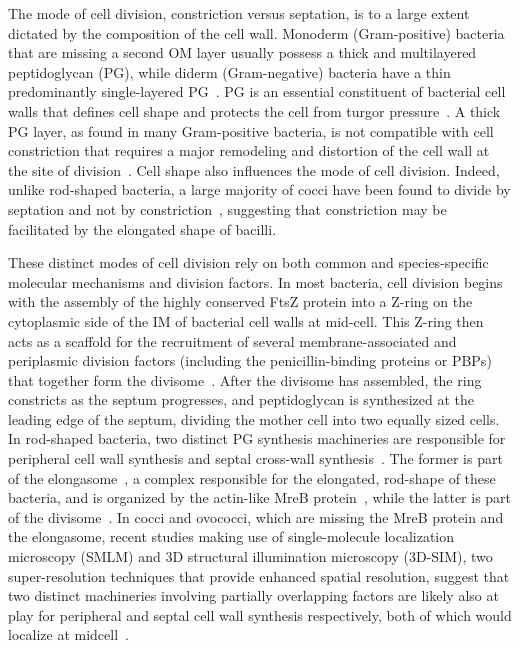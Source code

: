 The mode of cell division, constriction versus septation, is to a large extent dictated by the composition of the cell wall.
Monoderm (Gram-positive) bacteria that are missing a second OM layer usually possess a thick and multilayered peptidoglycan (PG), while diderm (Gram-negative) bacteria have a thin predominantly single-layered PG~\cite{gardePeptidoglycanStructureSynthesis2021}.
PG is an essential constituent of bacterial cell walls that defines cell shape and protects the cell from turgor pressure~\cite{gardePeptidoglycanStructureSynthesis2021}.
A thick PG layer, as found in many Gram-positive bacteria, is not compatible with cell constriction that requires a major remodeling and distortion of the cell wall at the site of division~\cite{nguyenSimulationsSuggestConstrictive2019}.
Cell shape also influences the mode of cell division.
Indeed, unlike rod-shaped bacteria, a large majority of cocci have been found to divide by septation and not by constriction~\cite{zapunDifferentShapesCocci2008,pinhoHowGetMechanisms2013}, suggesting that constriction may be facilitated by the elongated shape of bacilli.

These distinct modes of cell division rely on both common and species-specific molecular mechanisms and division factors.
In most bacteria, cell division begins with the assembly of the highly conserved FtsZ protein into a Z-ring on the cytoplasmic side of the IM of bacterial cell walls at mid-cell.
This Z-ring then acts as a scaffold for the recruitment of several membrane-associated and periplasmic division factors (including the penicillin-binding proteins or PBPs) that together form the divisome~\cite{pinhoHowGetMechanisms2013}.
After the divisome has assembled, the ring constricts as the septum progresses, and peptidoglycan is synthesized at the leading edge of the septum, dividing the mother cell into two equally sized cells.
In rod-shaped bacteria, two distinct PG synthesis machineries are responsible for peripheral cell wall synthesis and septal cross-wall synthesis~\cite{eganRegulationPeptidoglycanSynthesis2020}.
The former is part of the elongasome~\cite{eganRegulationPeptidoglycanSynthesis2020}, a complex responsible for the elongated, rod-shape of these bacteria, and is organized by the actin-like MreB protein~\cite{eganRegulationBacterialCell2017}, while the latter is part of the divisome~\cite{duAssemblyActivationEscherichia2017,denblaauwenDivisome25Road2017}.
In cocci and ovococci, which are missing the MreB protein and the elongasome, recent studies making use of single-molecule localization microscopy (SMLM) and 3D structural illumination microscopy (3D-SIM), two super-resolution techniques that provide enhanced spatial resolution, suggest that two distinct machineries involving partially overlapping factors are likely also at play for peripheral and septal cell wall synthesis respectively, both of which would localize at midcell~\cite{pinhoHowGetMechanisms2013,trouveNanoscaleDynamicsPeptidoglycan2021,perezOrganizationPeptidoglycanSynthesis2021,perez-nunezNewMorphogenesisPathway2011,lundMolecularCoordinationStaphylococcus2018}.


